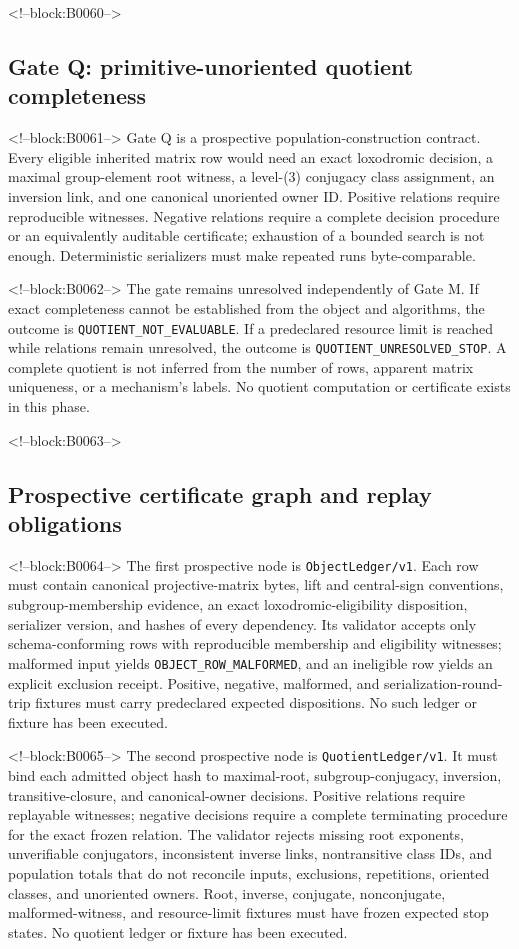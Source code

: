 \documentclass[11pt,a4paper]{article}
\begin{document}
<!--block:B0060-->
\subsection{Gate Q: primitive-unoriented quotient completeness}

<!--block:B0061-->
Gate Q is a prospective population-construction contract. Every eligible inherited matrix row would need an exact loxodromic decision, a maximal group-element root witness, a level-(3) conjugacy class assignment, an inversion link, and one canonical unoriented owner ID. Positive relations require reproducible witnesses. Negative relations require a complete decision procedure or an equivalently auditable certificate; exhaustion of a bounded search is not enough. Deterministic serializers must make repeated runs byte-comparable.

<!--block:B0062-->
The gate remains unresolved independently of Gate M. If exact completeness cannot be established from the object and algorithms, the outcome is \texttt{QUOTIENT\_NOT\_EVALUABLE}. If a predeclared resource limit is reached while relations remain unresolved, the outcome is \texttt{QUOTIENT\_UNRESOLVED\_STOP}. A complete quotient is not inferred from the number of rows, apparent matrix uniqueness, or a mechanism's labels. No quotient computation or certificate exists in this phase.

<!--block:B0063-->
\subsection{Prospective certificate graph and replay obligations}

<!--block:B0064-->
The first prospective node is \texttt{ObjectLedger/v1}. Each row must contain canonical projective-matrix bytes, lift and central-sign conventions, subgroup-membership evidence, an exact loxodromic-eligibility disposition, serializer version, and hashes of every dependency. Its validator accepts only schema-conforming rows with reproducible membership and eligibility witnesses; malformed input yields \texttt{OBJECT\_ROW\_MALFORMED}, and an ineligible row yields an explicit exclusion receipt. Positive, negative, malformed, and serialization-round-trip fixtures must carry predeclared expected dispositions. No such ledger or fixture has been executed.

<!--block:B0065-->
The second prospective node is \texttt{QuotientLedger/v1}. It must bind each admitted object hash to maximal-root, subgroup-conjugacy, inversion, transitive-closure, and canonical-owner decisions. Positive relations require replayable witnesses; negative decisions require a complete terminating procedure for the exact frozen relation. The validator rejects missing root exponents, unverifiable conjugators, inconsistent inverse links, nontransitive class IDs, and population totals that do not reconcile inputs, exclusions, repetitions, oriented classes, and unoriented owners. Root, inverse, conjugate, nonconjugate, malformed-witness, and resource-limit fixtures must have frozen expected stop states. No quotient ledger or fixture has been executed.
\end{document}
